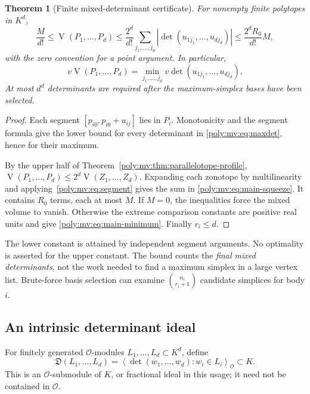 \documentclass[11pt,a4paper]{article}
\numberwithin{equation}{section}
\newtheorem{theorem}{Theorem}[section]
\theoremstyle{plain}
\newcommand{\OO}{\mathcal O}
\newcommand{\MV}{\operatorname{V}}
\newcommand{\Dideal}{\mathfrak D}
\begin{document}
\begin{theorem}[Finite mixed-determinant certificate]
\label{poly:mv:thm:determinant}
For nonempty finite polytopes in $K^d$,
\begin{equation}
\label{poly:mv:eq:main-squeeze}
 \frac{M}{d!}\le\MV(P_1,\ldots,P_d)
      \le\frac{2^d}{d!}\sum_{j_1,\ldots,j_d}
               |\det(u_{1j_1},\ldots,u_{dj_d})|
      \le\frac{2^dR_0}{d!}M,
\end{equation}
with the zero convention for a point argument. In particular,
\begin{equation}
\label{poly:mv:eq:main-minimum}
 \boxed{\quad
 v\MV(P_1,\ldots,P_d)
   =\min_{j_1,\ldots,j_d}
       v\det(u_{1j_1},\ldots,u_{dj_d}).\quad}
\end{equation}
At most $d^d$ determinants are required after the maximum-simplex bases
have been selected.
\end{theorem}
\begin{proof}
Each segment $[p_{i0},p_{i0}+u_{ij}]$ lies in $P_i$. Monotonicity and the
segment formula give the lower bound for every determinant in
\eqref{poly:mv:eq:maxdet}, hence for their maximum.

By the upper half of Theorem~\ref{poly:mv:thm:parallelotope-profile},
$\MV(P_1,\ldots,P_d)\le2^d\MV(Z_1,\ldots,Z_d)$. Expanding each zonotope
by multilinearity and applying~\eqref{poly:mv:eq:segment} gives the sum in
\eqref{poly:mv:eq:main-squeeze}. It contains $R_0$ terms, each at most $M$.
If $M=0$, the inequalities force the mixed volume to vanish. Otherwise
the extreme comparison constants are positive real units and give
\eqref{poly:mv:eq:main-minimum}. Finally $r_i\le d$.
\end{proof}

The lower constant is attained by independent segment arguments. No
optimality is asserted for the upper constant. The bound counts the
\emph{final mixed determinants}, not the work needed to find a maximum
simplex in a large vertex list. Brute-force basis selection can examine
$\binom{n_i}{r_i+1}$ candidate simplices for body $i$.

\subsection{An intrinsic determinant ideal}
For finitely generated $\OO$-modules $L_1,\ldots,L_d\subset K^d$, define
\[
 \Dideal(L_1,\ldots,L_d)
 =\left\langle\det(w_1,\ldots,w_d):w_i\in L_i\right\rangle_{\OO}
 \subset K.
\]
This is an $\OO$-submodule of $K$, or fractional ideal in this usage; it
need not be contained in $\OO$.
\end{document}
